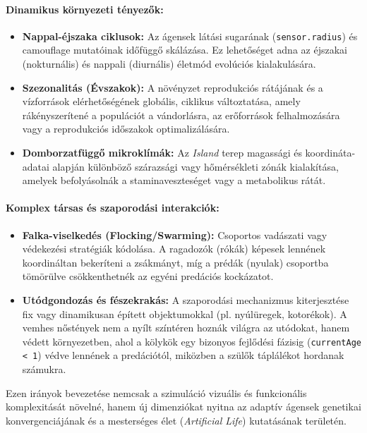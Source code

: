 \paragraph{Dinamikus környezeti tényezők:}
\begin{itemize}
    \item \textbf{Nappal-éjszaka ciklusok:} Az ágensek látási sugarának (\texttt{sensor.radius}) és camouflage mutatóinak időfüggő skálázása. Ez lehetőséget adna az éjszakai (nokturnális) és nappali (diurnális) életmód evolúciós kialakulására.
    \item \textbf{Szezonalitás (Évszakok):} A növényzet reprodukciós rátájának és a vízforrások elérhetőségének globális, ciklikus változtatása, amely rákényszerítené a populációt a vándorlásra, az erőforrások felhalmozására vagy a reprodukciós időszakok optimalizálására.
    \item \textbf{Domborzatfüggő mikroklímák:} Az \textit{Island} terep magassági és koordináta-adatai alapján különböző szárazsági vagy hőmérsékleti zónák kialakítása, amelyek befolyásolnák a staminaveszteséget vagy a metabolikus rátát.
\end{itemize}

\paragraph{Komplex társas és szaporodási interakciók:}
\begin{itemize}
    \item \textbf{Falka-viselkedés (Flocking/Swarming):} Csoportos vadászati vagy védekezési stratégiák kódolása. A ragadozók (rókák) képesek lennének koordináltan bekeríteni a zsákmányt, míg a prédák (nyulak) csoportba tömörülve csökkenthetnék az egyéni predációs kockázatot.
    \item \textbf{Utódgondozás és fészekrakás:} A szaporodási mechanizmus kiterjesztése fix vagy dinamikusan épített objektumokkal (pl. nyúlüregek, kotorékok). A vemhes nőstények nem a nyílt színtéren hoznák világra az utódokat, hanem védett környezetben, ahol a kölykök egy bizonyos fejlődési fázisig (\texttt{currentAge < 1}) védve lennének a predációtól, miközben a szülők táplálékot hordanak számukra.
\end{itemize}

Ezen irányok bevezetése nemcsak a szimuláció vizuális és funkcionális komplexitását növelné, hanem új dimenziókat nyitna az adaptív ágensek genetikai konvergenciájának és a mesterséges élet (\textit{Artificial Life}) kutatásának területén.

